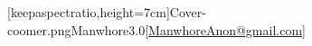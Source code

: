 \documentclass[a4paper,12pt,american,oneside,numbers=noenddot]{scrreprt} %
\begin{document}
[keepaspectratio,height=7cm]{Cover-coomer.png}{Manwhore}{3.0}[\href{mailto:ManwhoreAnon@gmail.com}{ManwhoreAnon@gmail.com}]

\tcolortoc




\nocite{*}
\clearpage
\printbibliography[title={Bibliography}]
\clearpage




\end{document}

